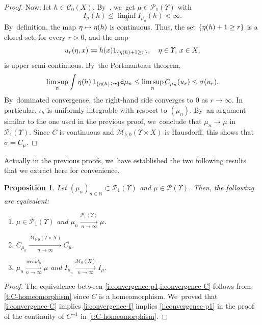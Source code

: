 \documentclass[JEP,XML,SOM,Unicode,published]{cedram}
\newcommand\mto{\mathchoice{\longmapsto}{\mapsto}{\mapsto}{\mapsto}}
\newtheorem{proposition}[theorem]{Proposition}
\theoremstyle{definition}
\theoremstyle{remark}
\DeclarePairedDelimiter{\set}{\lbrace}{\rbrace}
\begin{document}
\begin{proof}
Now, let $h \in \mathscr{C}_{0}(X)$.
By~\cite[Lem.\,5.11]{KallenbergFMP}, we~get $\mu \in \mathscr{P}_{1}(\varUpsilon)$ with
\begin{equation*}
I_{\mu}(h) \leq \liminf_{n} I_{\mu_{n}}(h) < \infty.
\end{equation*}
By~definition, the map $\eta \mto \eta(h)$ is continuous.
Thus, the set $\set{ \eta(h) + 1 \geq r }$ is a closed set, for every $r > 0$,
and the map
\begin{equation*}
u_{r}(\eta, x) \coloneq h(x) 1_{\set{\eta(h) + 1 \geq r}}, \quad \eta \in \varUpsilon,\, x \in X,
\end{equation*}
is upper semi-continuous.
By~the Portmanteau theorem,
\begin{equation*}
\limsup_{n} \int \eta(h)\, 1_{\set{\eta(h) \geq r}} \mathtt{d} \mu_{n} \leq \limsup_{n} C_{\mu_{n}}(u_{r}) \leq \sigma(u_{r}).
\end{equation*}
By~dominated convergence, the right-hand side converges to $0$ as $r \to \infty$.
In particular, $\iota_{h}$ is uniformly integrable with respect to $(\mu_{n})$.
By~an argument similar to the one used in the previous proof, we~conclude that $\mu_{n} \to \mu$ in $\mathscr{P}_{1}(\varUpsilon)$.
Since $C$ is continuous and $\mathscr{M}_{b,0}(\varUpsilon \times X)$ is Hausdorff, this shows that $\sigma = C_{\mu}$.
\end{proof}

Actually in the previous proofs, we~have established the two following results that we extract here for convenience.
\begin{proposition}\label{t:p1-convergence}
Let $(\mu_{n})_{n \in \mathbb{N}} \subset \mathscr{P}_{1}(\varUpsilon)$ and $\mu \in \mathscr{P}(\varUpsilon)$.
Then, the following are equivalent:
\begin{enumerate}[$(\rm i)$, wide]
\item\label{i:convergence-p1} $\mu \in \mathscr{P}_{1}(\varUpsilon)$ and $\mu_{n} \xrightarrow[n \to \infty]{\mathscr{P}_{1}(\varUpsilon)} \mu$.
\item\label{i:convergence-C} $C_{\mu_{n}} \xrightarrow[n \to \infty]{\mathscr{M}_{b,0}(\varUpsilon \times X)} C_{\mu}$.
\item\label{i:convergence-I} $\mu_{n} \xrightarrow[n \to \infty]{weakly} \mu$ and $I_{\mu_{n}} \xrightarrow[n \to \infty]{\mathscr{M}_{0}(X)} I_{\mu}$.
\end{enumerate}
\end{proposition}

\begin{proof}
The equivalence between \cref{i:convergence-p1,i:convergence-C} follows from \cref{t:C-homeomorphism} since $C$ is a homeomorphism. We~proved that \cref{i:convergence-C} implies \cref{i:convergence-I} implies \cref{i:convergence-p1} in the proof of the continuity of $C^{-1}$ in \cref{t:C-homeomorphism}.
\end{proof}
\end{document}
